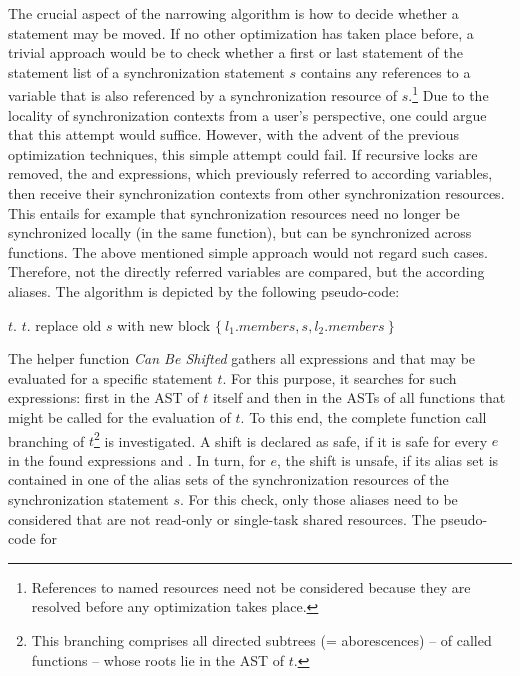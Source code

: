 The crucial aspect of the narrowing algorithm is how to decide whether a statement may be moved. If no other optimization has taken place before, a trivial approach would be to check whether a first or last statement of the statement list of a synchronization statement $s$ contains any references to a variable that is also referenced by a synchronization resource of $s$.\footnote{References to named resources need not be considered because they are resolved before any optimization takes place.} Due to the locality of synchronization contexts from a user's perspective, one could argue that this attempt would suffice. However, with the advent of the previous optimization techniques, this simple attempt could fail. If recursive locks are removed, the  and  expressions, which previously referred to according variables, then receive their synchronization contexts from other synchronization resources. This entails for example that synchronization resources need no longer be synchronized locally (in the same function), but can be synchronized across functions. The above mentioned simple approach would not regard such cases. Therefore, not the directly referred variables are compared, but the according aliases. The algorithm is depicted by the following pseudo-code:
\begin{algorithmic}
\State {}
    \State $t$. 
  \EndWhile
    \State $t$. 
  \EndWhile
    \State replace old $s$ with new block $\{\ l_1.\textit{members}, s, l_2.\textit{members}\ \}$
  \EndIf
\EndFor
\EndFunction
\end{algorithmic}
The helper function \textit{Can Be Shifted} gathers all expressions  and  that may be evaluated for a specific statement $t$. For this purpose, it searches for such expressions: first in the AST of $t$ itself and then in the ASTs of all functions that might be called for the evaluation of $t$. To this end, the complete function call branching of $t$\footnote{This branching comprises all directed subtrees (= aborescences) -- of called functions -- whose roots lie in the AST of $t$.} is investigated. A shift is declared as safe, if it is safe for every $e$ in the found expressions  and . In turn, for $e$, the shift is unsafe, if its alias set is contained in one of the alias sets of the synchronization resources of the synchronization statement $s$. For this check, only those aliases need to be considered that are not read-only or single-task shared resources.  The pseudo-code for 
